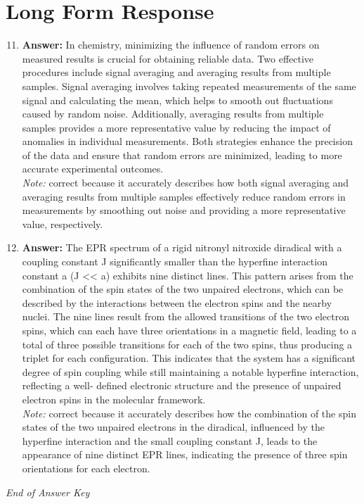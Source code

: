 \documentclass[12pt]{article}
\begin{document}
\section*{Long Form Response}
\begin{enumerate}[label=\arabic*.]
\setcounter{enumi}{10}
\item \textbf{Answer:} In chemistry, minimizing the influence of random errors on measured results is crucial for obtaining reliable data. Two effective procedures include signal averaging and averaging results from multiple samples. Signal averaging involves taking repeated measurements of the same signal and calculating the mean, which helps to smooth out fluctuations caused by random noise. Additionally, averaging results from multiple samples provides a more representative value by reducing the impact of anomalies in individual measurements. Both strategies enhance the precision of the data and ensure that random errors are minimized, leading to more accurate experimental outcomes.
\\ \textit{Note:} correct because it accurately describes how both signal averaging and averaging results from multiple samples effectively reduce random errors in measurements by smoothing out noise and providing a more representative value, respectively.
\item \textbf{Answer:} The EPR spectrum of a rigid nitronyl nitroxide diradical with a coupling constant J significantly smaller than the hyperfine interaction constant a (J \textless{}\textless{} a) exhibits nine distinct lines. This pattern arises from the combination of the spin states of the two unpaired electrons, which can be described by the interactions between the electron spins and the nearby nuclei. The nine lines result from the allowed transitions of the two electron spins, which can each have three orientations in a magnetic field, leading to a total of three possible transitions for each of the two spins, thus producing a triplet for each configuration. This indicates that the system has a significant degree of spin coupling while still maintaining a notable hyperfine interaction, reflecting a well- defined electronic structure and the presence of unpaired electron spins in the molecular framework.
\\ \textit{Note:} correct because it accurately describes how the combination of the spin states of the two unpaired electrons in the diradical, influenced by the hyperfine interaction and the small coupling constant J, leads to the appearance of nine distinct EPR lines, indicating the presence of three spin orientations for each electron.
\end{enumerate}

\vfill
\noindent\textit{End of Answer Key}
\end{document}
